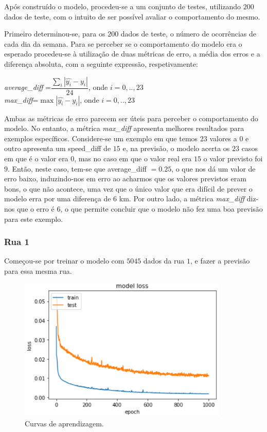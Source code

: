 \documentclass[a4paper, 12pt]{article}
\begin{document}
Após construído o modelo, procedeu-se a um conjunto de testes, utilizando $200$ dados de teste, com o intuito de ser possível avaliar o comportamento do mesmo.

Primeiro determinou-se, para os $200$ dados de teste, o número de ocorrências de cada dia da semana. Para se perceber se o comportamento do modelo era o esperado procedeu-se à utilização de duas métricas de erro, a média dos erros e a diferença absoluta, com a seguinte expressão, respetivamente:

\begin{center}
	\textit{average\_diff }=$\dfrac{\sum_{i}|\hat{y_i}-y_i|}{24}$, onde $i=0,..,23$\\
	\vspace{0.5cm}
\textit{max\_diff}=$\max{|\hat{y_i}-y_i|}$, onde $i=0,..,23$\\
\end{center}

Ambas as métricas de erro parecem ser úteis para perceber o comportamento do modelo. No entanto, a métrica \textit{max\_diff} apresenta melhores resultados para exemplos específicos. Considere-se um exemplo em que temos $23$ valores a $0$ e outro apresenta um speed\_diff de $15$ e, na previsão, o modelo acerta os $23$ casos em que é o valor era $0$, mas no caso em que o valor real era $15$ o valor previsto foi $9$. Então, neste caso, tem-se que {average\_diff }$=0.25$, o que nos dá um valor de erro baixo, induzindo-nos em erro ao acharmos que os valores previstos eram bons, o que não acontece, uma vez que o único valor que era difícil de prever o modelo erra por uma diferença de $6$ km. Por outro lado, a métrica \textit{max\_diff} diz-nos que o erro é $6$, o que permite concluir que o modelo não fez uma boa previsão para este exemplo.

\subsubsection{Rua 1}

Começou-se por treinar o modelo com $5045$ dados da rua $1$, e fazer a previsão para essa mesma rua. 

\begin{figure}[H]
	\centering
	\includegraphics[width=10cm]{resultados/curvas_aprend_1.png}
	\caption{Curvas de aprendizagem.}
	\label{figure:curvas_aprend_1}
\end{figure}
\end{document}
